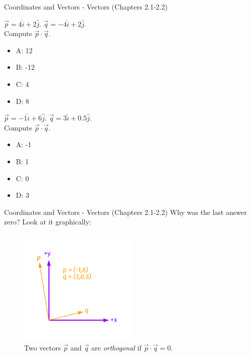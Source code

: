 \documentclass{beamer}
\begin{document}
\begin{frame}{Coordinates and Vectors - Vectors (Chapters 2.1-2.2)}
\small
\begin{minipage}[b]{0.45\linewidth}
$\vec{p} = 4\hat{i}+2\hat{j}$.  $\vec{q} = -4\hat{i}+2\hat{j}$.  \\
Compute $\vec{p} \cdot \vec{q}$.
\vspace{0.2cm}
\begin{itemize}
\item A: 12
\item B: -12
\item C: 4
\item D: 8
\end{itemize}
\end{minipage}
\hspace{0.5cm}
\begin{minipage}[b]{0.45\linewidth}
$\vec{p} = -1\hat{i}+6\hat{j}$.  $\vec{q} = 3\hat{i}+0.5\hat{j}$.  \\
Compute $\vec{p} \cdot \vec{q}$.
\vspace{0.2cm}
\begin{itemize}
\item A: -1
\item B: 1
\item C: 0
\item D: 3
\end{itemize}
\end{minipage}
\end{frame}

\begin{frame}{Coordinates and Vectors - Vectors (Chapters 2.1-2.2)}
Why was the last answer zero?  Look at it graphically:
\begin{figure}
\centering
\includegraphics[width=0.5\textwidth,trim=1cm 1cm 1cm 1cm,clip=true]{figures/Vectors5.pdf}
\caption{\label{fig:twovectors4} Two vectors $\vec{p}$ and $\vec{q}$ are \textit{orthogonal} if $\vec{p} \cdot \vec{q} = 0$.}
\end{figure}
\end{frame}
\end{document}
